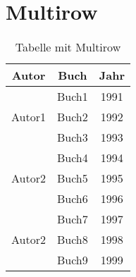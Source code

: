\section{Multirow}
\begin{table}[ht]
\centering
	\begin{tabular}{|c|c|c||}
		\hline
		Autor					&	Buch	&	Jahr	\\
		\hline
		\multirow{3}{*}{Autor1}	&	Buch1	&	1991	\\
		\cline{2-3}
								& 	Buch2	& 	1992	\\
		\cline{2-3}
								& 	Buch3	& 	1993	\\
		\hline
		\multirow{3}{*}{Autor2}	&	Buch4	&	1994	\\
		\cline{2-3}
								& 	Buch5	& 	1995	\\
		\cline{2-3}
								& 	Buch6	& 	1996	\\
		\hline
		\multirow{3}{*}{Autor2}	&	Buch7	&	1997	\\
		\cline{2-3}
								& 	Buch8	& 	1998	\\
		\cline{2-3}
								& 	Buch9	& 	1999	\\
		\hline
	\end{tabular}
\caption{Tabelle mit Multirow}
\end{table}